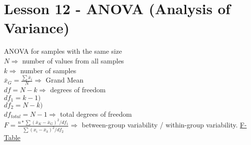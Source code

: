 \documentclass[landscape]{article}
\begin{document}
	\section{Lesson 12 - ANOVA (Analysis of Variance)}
		ANOVA for samples with the same size
		\\\(N \Rightarrow\) number of values from all samples
		\\\(k \Rightarrow\) number of samples
		\\\(\bar{x}_G = \frac{\sum{\bar{x}_i}}{N}\Rightarrow\) Grand Mean
		\\\(df = N - k \Rightarrow\) degrees of freedom
		\\\(df_1 = k - 1)\)
		\\\(df_2 = N - k)\)
		\\\(df_{total} = N - 1 \Rightarrow\) total degrees of freedom
		\\\(F = \frac{n * \sum{(\bar{x}_K - \bar{x}_G)^2 / df_1}}{\sum{(x_i - \bar{x}_k)^2 / df_2}} \Rightarrow\) between-group variability / within-group variability. \href{http://www.socr.ucla.edu/applets.dir/f\_table.html}{F-Table}
		
	
\end{document}
